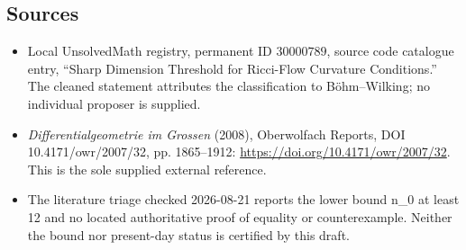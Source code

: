 \documentclass[11pt]{article}
\begin{document}
\subsection{Sources}
\begin{itemize}
\item Local UnsolvedMath registry, permanent ID \(30000789\), source code catalogue entry, ``Sharp Dimension Threshold for Ricci-Flow Curvature Conditions.'' The cleaned statement attributes the classification to B\"ohm--Wilking; no individual proposer is supplied.
\item \emph{Differentialgeometrie im Grossen} (2008), Oberwolfach Reports, DOI 10.4171/owr/2007/32, pp. 1865--1912: \url{https://doi.org/10.4171/owr/2007/32}. This is the sole supplied external reference.
\item The literature triage checked 2026-08-21 reports the lower bound n\_0 at least 12 and no located authoritative proof of equality or counterexample. Neither the bound nor present-day status is certified by this draft.
\end{itemize}
\end{document}

